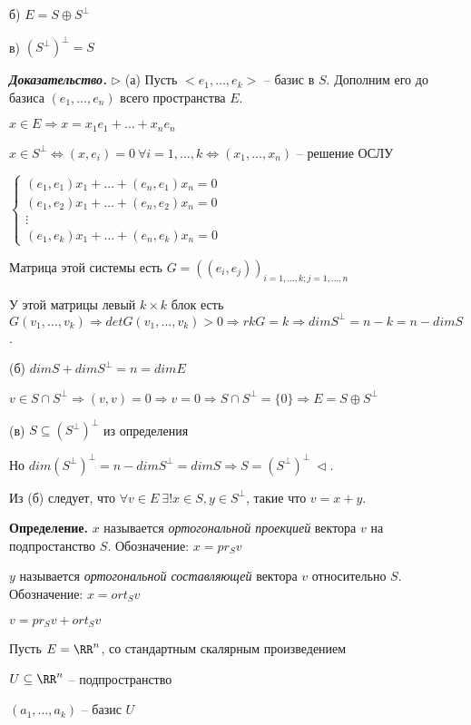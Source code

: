 б) $E = S \oplus S^{\bot}$

в) $(S^{\bot})^{\bot} = S$

\bigskip
\textbf{\textit{Доказательство.}} $\rhd$ (а) Пусть $<e_1, \dots, e_k>$  -- базис в $S$. Дополним его до базиса $(e_1, \dots, e_n)$ всего пространства $E$.

$x \in E \Rightarrow x = x_1 e_1 + \dots + x_n e_n$

$x \in S^{\bot} \Leftrightarrow (x, e_i) = 0 \ \forall i = 1, \dots, k \Leftrightarrow (x_1, \dots, x_n)$ -- решение ОСЛУ

$\begin{cases}
(e_1, e_1) x_1 + \dots + (e_n, e_1) x_n = 0 \\
(e_1, e_2) x_1 + \dots + (e_n, e_2) x_n = 0 \\
\vdots \\
(e_1, e_k) x_1 + \dots + (e_n, e_k) x_n = 0
\end{cases}$

Матрица этой системы есть $G = ((e_i, e_j))_{i=1, \dots, k; j = 1, \dots, n}$

У этой матрицы левый $k \times k$ блок есть $G(v_1, \dots, v_k) \Rightarrow det G(v_1, \dots, v_k) > 0 \Rightarrow rkG = k \Rightarrow dim S^{\bot} = n - k = n - dimS$.

(б) $dimS + dim S^{\bot} = n = dimE$

$v \in S \cap S^{\bot} \Rightarrow (v, v) = 0 \Rightarrow v = 0 \Rightarrow S \cap S^{\bot} = \{0\} \Rightarrow E = S \oplus S^{\bot}$

(в) $S \subseteq (S^{\bot})^{\bot}$ из определения

Но $dim(S^{\bot})^{\bot} = n - dim S^{\bot} = dim S \Rightarrow S = (S^{\bot})^{\bot} \ \lhd$.

\bigskip
Из (б) следует, что $\forall v \in E \ \exists! x \in S, y \in S^{\bot}$, такие что $v = x + y$.

\bigskip
\textbf{Определение.} $x$ называется \textit{ортогональной проекцией} вектора $v$ на подпростанство $S$. Обозначение: $x = pr_S v$

$y$ называется \textit{ортогональной составляющей} вектора $v$ относительно $S$. Обозначение: $x = ort_S v$

$v = pr_S v + ort_S v$

\bigskip
Пусть $E = \RR^n$, со стандартным скалярным произведением

$U \subseteq \RR^n$ -- подпространство

$(a_1, \dots, a_k)$ -- базис $U$

